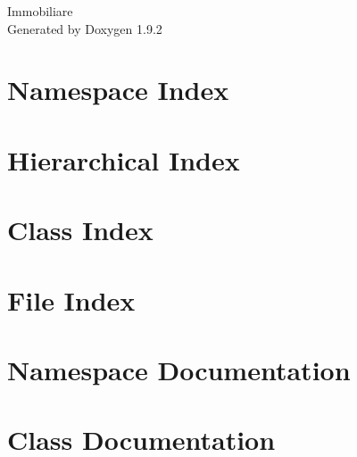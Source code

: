\documentclass[twoside]{book}
\newcommand{\+}{\discretionary{\mbox{\scriptsize$\hookleftarrow$}}{}{}}
\newcommand{\clearemptydoublepage}{%
    \newpage{\pagestyle{empty}\cleardoublepage}%
  }
\begin{document}
  \raggedbottom
    \hypersetup{pageanchor=false,
                bookmarksnumbered=true,
                pdfencoding=unicode
               }
  \begin{titlepage}
  \vspace*{7cm}
  \begin{center}%
  {\Large Immobiliare}\\
  \vspace*{1cm}
  {\large Generated by Doxygen 1.9.2}\\
  \end{center}
  \end{titlepage}
  \clearemptydoublepage
  \tableofcontents
  \clearemptydoublepage
  \hypersetup{pageanchor=true}
\chapter{Namespace Index}

\chapter{Hierarchical Index}

\chapter{Class Index}

\chapter{File Index}

\chapter{Namespace Documentation}




\chapter{Class Documentation}
































\end{document}
